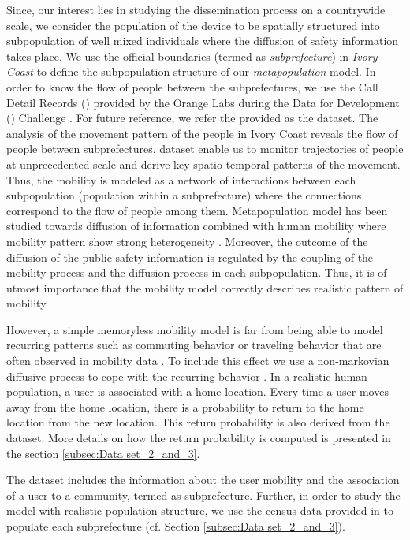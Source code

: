 \documentclass[review]{elsarticle}
\begin{document}
Since, our interest lies in studying the dissemination process on a countrywide scale, we consider the population of the device to be spatially structured into subpopulation of well mixed individuals where the diffusion of safety information takes place. We use the official boundaries (termed as \emph{subprefecture}) in \emph{Ivory Coast} to define the subpopulation structure of our \emph{metapopulation} model. In order to know the flow of people between the subprefectures, we use the Call Detail Records () provided by the Orange Labs during the Data for Development () Challenge \cite{Blondel2012}. For future reference, we refer the provided  as the  dataset. The analysis of the movement pattern of the people in Ivory Coast reveals the flow of people between subprefectures.  dataset enable us to monitor trajectories of people at unprecedented scale and derive key spatio-temporal patterns of the movement. Thus, the mobility is modeled as a network of interactions between each subpopulation (population within a subprefecture) where the connections correspond to the flow of people among them. Metapopulation\cite{Arino2006, Watts2005} model has been studied towards diffusion of information combined with human mobility where mobility pattern show strong heterogeneity \cite{gonzálezunderstanding2008, brockmannthe2006, colizzaepidemic2008}. Moreover, the outcome of the diffusion of the public safety information is regulated by the coupling of the mobility process and the diffusion process in each subpopulation. Thus, it is of utmost importance that the mobility model correctly describes realistic pattern of mobility.

However, a simple memoryless mobility model is far from being able to model recurring patterns such as commuting behavior or traveling behavior that are often observed in mobility data \cite{gonzálezunderstanding2008, songlimits2010}. To include this effect we use a non-markovian diffusive process to cope with the recurring behavior \cite{balcanphase2011, polettoheterogeneous2012}. In a realistic human population, a user is associated with a home location. Every time a user moves away from the home location, there is a probability to return to the home location from the new location. This return probability is also derived from the  dataset. More details on how the return probability is computed is presented in the section \ref{subsec:Data set_2_and_3}.

The  dataset includes the information about the user mobility and the association of a user to a community, termed as subprefecture. Further, in order to study the model with realistic population structure, we use the census data provided in \cite{Web1} to populate each subprefecture (cf. Section \ref{subsec:Data set_2_and_3}).
\end{document}
